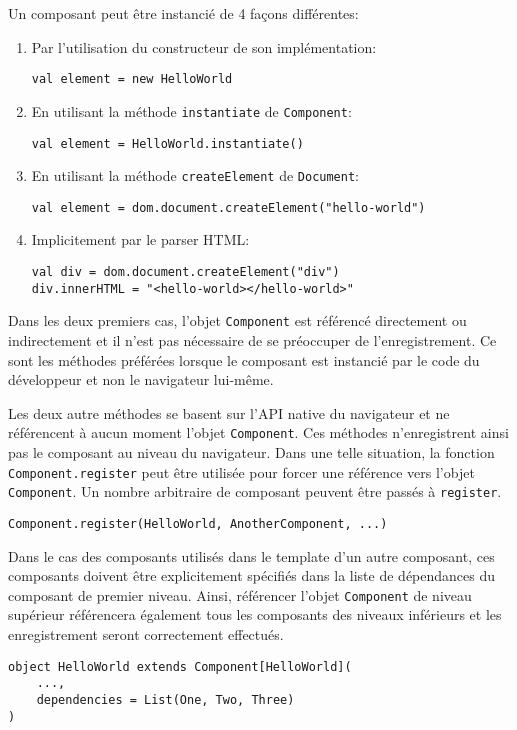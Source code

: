 Un composant peut être instancié de 4 façons différentes:
\begin{enumerate}
	\item Par l'utilisation du constructeur de son implémentation:
	\begin{lstlisting}
val element = new HelloWorld
	\end{lstlisting}
	\item En utilisant la méthode \texttt{instantiate} de \texttt{Component}:
	\begin{lstlisting}
val element = HelloWorld.instantiate()
	\end{lstlisting}
	\item En utilisant la méthode \texttt{createElement} de \texttt{Document}:
	\begin{lstlisting}
val element = dom.document.createElement("hello-world")
	\end{lstlisting}
	\item Implicitement par le parser HTML:
	\begin{lstlisting}
val div = dom.document.createElement("div")
div.innerHTML = "<hello-world></hello-world>"
	\end{lstlisting}
\end{enumerate}

Dans les deux premiers cas, l'objet \texttt{Component} est référencé directement ou indirectement et il n'est pas nécessaire de se préoccuper de l'enregistrement. Ce sont les méthodes préférées lorsque le composant est instancié par le code du développeur et non le navigateur lui-même.

Les deux autre méthodes se basent sur l'API native du navigateur et ne référencent à aucun moment l'objet \texttt{Component}. Ces méthodes n'enregistrent ainsi pas le composant au niveau du navigateur. Dans une telle situation, la fonction \texttt{Component.register} peut être utilisée pour forcer une référence vers l'objet \texttt{Component}. Un nombre arbitraire de composant peuvent être passés à \texttt{register}.
\begin{lstlisting}
Component.register(HelloWorld, AnotherComponent, ...)
\end{lstlisting}

Dans le cas des composants utilisés dans le template d'un autre composant, ces composants doivent être explicitement spécifiés dans la liste de dépendances du composant de premier niveau. Ainsi, référencer l'objet \texttt{Component} de niveau supérieur référencera également tous les composants des niveaux inférieurs et les enregistrement seront correctement effectués.
\begin{lstlisting}
object HelloWorld extends Component[HelloWorld](
	...,
	dependencies = List(One, Two, Three)
)
\end{lstlisting}

